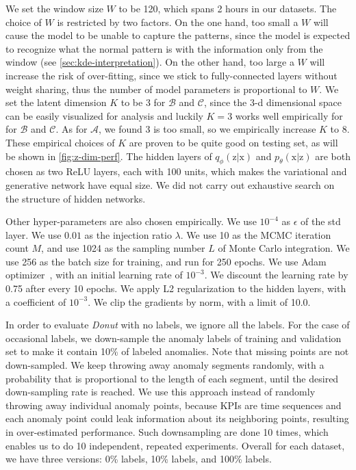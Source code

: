\documentclass[sigconf]{acmart}
\newcommand{\DONUT}{\textit{Donut}}
\newcommand{\DATASETA}{$\mathcal{A}$}
\newcommand{\DATASETB}{$\mathcal{B}$}
\newcommand{\DATASETC}{$\mathcal{C}$}
\newcommand{\vv}[1]{\bm{\mathrm{{#1}}}}
\begin{document}
We set the window size $W$ to be 120, which spans 2 hours in our datasets.
The choice of $W$ is restricted by two factors. On the one hand, too small a $W$ will cause the model to be unable to capture the patterns, since the model is expected to recognize what the normal pattern is with the information only from the window (see \cref{sec:kde-interpretation}). On the other hand, too large a $W$ will increase the risk of over-fitting, since we stick to fully-connected layers without weight sharing, thus the number of model parameters is proportional to $W$.
We set the latent dimension $K$ to be 3 for \DATASETB{} and \DATASETC{}, since the 3-d dimensional space can be easily visualized for analysis and luckily $K=3$ works well empirically for for \DATASETB{} and \DATASETC{}. As for \DATASETA{}, we found 3 is too small, so we empirically increase $K$ to 8.
These empirical choices of $K$ are proven to be quite good on testing set, as will be shown in \cref{fig:z-dim-perf}.
The hidden layers of $q_{\phi}(\vv{z}|\vv{x})$ and $p_{\theta}(\vv{x}|\vv{z})$ are both chosen as two ReLU layers, each with 100 units, which makes the variational and generative network have equal size.
We did not carry out exhaustive search on the structure of hidden networks.

Other hyper-parameters are also chosen empirically.
We use $10^{-4}$ as $\epsilon$ of the std layer.
We use $0.01$ as the injection ratio $\lambda$.
We use 10 as the MCMC iteration count $M$, and use 1024 as the sampling number $L$ of Monte Carlo integration.
We use 256 as the batch size for training, and run for 250 epochs.
We use Adam optimizer~\cite{kingma_adam:_2014}, with an initial learning rate of $10^{-3}$.
We discount the learning rate by 0.75 after every 10 epochs.
We apply L2 regularization to the hidden layers, with a coefficient of $10^{-3}$.
We clip the gradients by norm, with a limit of 10.0.

In order to evaluate \DONUT{} with no labels, we ignore all the labels. For the case of occasional labels, we down-sample the anomaly labels of training and validation set to make it contain 10\% of labeled anomalies. Note that missing points are not down-sampled. We keep throwing away anomaly segments randomly, with a probability that is proportional to the length of each segment, until the desired down-sampling rate is reached. We use this approach instead of randomly throwing away individual anomaly points, because KPIs are time sequences and each anomaly point could leak information about its neighboring points, resulting in over-estimated performance. Such downsampling are done 10 times, which enables us to do 10 independent, repeated experiments. Overall for each dataset, we have three versions: 0\% labels, 10\% labels, and 100\% labels.
\end{document}
